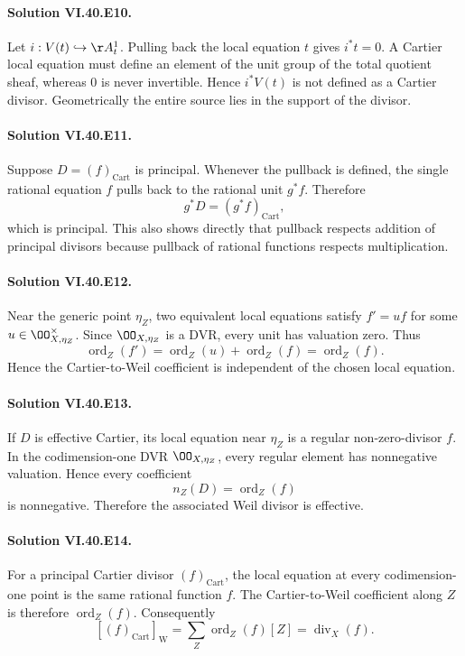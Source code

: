 \paragraph{Solution VI.40.E10.}
Let \(i:V(t)\hookrightarrow\AA^1_t\).  Pulling back the local equation \(t\) gives \(i^*t=0\).  A Cartier local equation must define an element of the unit group of the total quotient sheaf, whereas \(0\) is never invertible.  Hence \(i^*V(t)\) is not defined as a Cartier divisor.  Geometrically the entire source lies in the support of the divisor.

\paragraph{Solution VI.40.E11.}
Suppose \(D=(f)_{\mathrm{Cart}}\) is principal.  Whenever the pullback is defined, the single rational equation \(f\) pulls back to the rational unit \(g^*f\).  Therefore
\[
g^*D=(g^*f)_{\mathrm{Cart}},
\]
which is principal.  This also shows directly that pullback respects addition of principal divisors because pullback of rational functions respects multiplication.

\paragraph{Solution VI.40.E12.}
Near the generic point \(\eta_Z\), two equivalent local equations satisfy \(f'=uf\) for some \(u\in\OO_{X,\eta_Z}^\times\).  Since \(\OO_{X,\eta_Z}\) is a DVR, every unit has valuation zero.  Thus
\[
\operatorname{ord}_Z(f')
=\operatorname{ord}_Z(u)+\operatorname{ord}_Z(f)
=\operatorname{ord}_Z(f).
\]
Hence the Cartier-to-Weil coefficient is independent of the chosen local equation.

\paragraph{Solution VI.40.E13.}
If \(D\) is effective Cartier, its local equation near \(\eta_Z\) is a regular non-zero-divisor \(f\).  In the codimension-one DVR \(\OO_{X,\eta_Z}\), every regular element has nonnegative valuation.  Hence every coefficient
\[
n_Z(D)=\operatorname{ord}_Z(f)
\]
is nonnegative.  Therefore the associated Weil divisor is effective.

\paragraph{Solution VI.40.E14.}
For a principal Cartier divisor \((f)_{\mathrm{Cart}}\), the local equation at every codimension-one point is the same rational function \(f\).  The Cartier-to-Weil coefficient along \(Z\) is therefore \(\operatorname{ord}_Z(f)\).  Consequently
\[
[(f)_{\mathrm{Cart}}]_{\mathrm W}
=\sum_Z\operatorname{ord}_Z(f)[Z]
=\operatorname{div}_X(f).
\]

